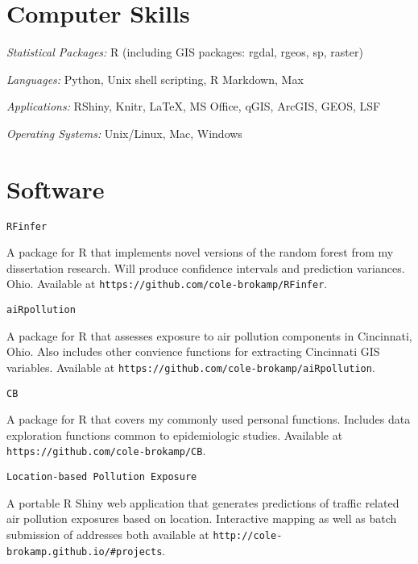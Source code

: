 \documentclass[margin,line]{res}
\newenvironment{list1}{
  \begin{list}{\ding{113}}{%
      \setlength{\itemsep}{0in}
      \setlength{\parsep}{0in} \setlength{\parskip}{0in}
      \setlength{\topsep}{0in} \setlength{\partopsep}{0in} 
      \setlength{\leftmargin}{0.17in}}}{\end{list}}
\newenvironment{list3}{
  \begin{list}{}{%
      \setlength{\itemsep}{0in}
      \setlength{\parsep}{0in} \setlength{\parskip}{0in}
      \setlength{\topsep}{0in} \setlength{\partopsep}{0in} 
      \setlength{\leftmargin}{0in}}}{\end{list}}
\begin{document}
\begin{resume}
\section{\sc Computer Skills} 

\begin{list3} \itemsep 4pt
\item[] \textit{Statistical Packages:}  R (including GIS packages: rgdal, rgeos, sp, raster)
\item[] \textit{Languages:} Python, Unix shell scripting, R Markdown, Max
\item[] \textit{Applications:} RShiny, Knitr, \LaTeX, MS Office, qGIS, ArcGIS, GEOS, LSF 
\item[] \textit{Operating Systems:}  Unix/Linux, Mac, Windows\\ 
\end{list3}

\section{\sc Software}

\texttt{RFinfer}
\begin{list1} \itemsep 2pt
\item[] A package for R that implements novel versions of the random forest from my dissertation research. Will produce confidence intervals and prediction variances. Ohio. 
Available at \texttt{https://github.com/cole-brokamp/RFinfer}.
\end{list1}

\texttt{aiRpollution}
\begin{list1} \itemsep 2pt
\item[] A package for R that assesses exposure to air pollution components in Cincinnati, Ohio.  Also includes other convience functions for extracting Cincinnati GIS variables. 
Available at \texttt{https://github.com/cole-brokamp/aiRpollution}.
\end{list1}

\texttt{CB}
\begin{list1} \itemsep 2pt
\item[] A package for R that covers my commonly used personal functions. Includes data exploration functions common to epidemiologic studies. 
Available at \texttt{https://github.com/cole-brokamp/CB}.
\end{list1}

\texttt{Location-based Pollution Exposure}
\begin{list1} \itemsep 2pt
\item[] A portable R Shiny web application that generates predictions of traffic related air pollution exposures based on location.  Interactive mapping as well as batch submission of addresses both available at \texttt{http://cole-brokamp.github.io/\#projects}.
\end{list1}


\end{resume}
\end{document}
